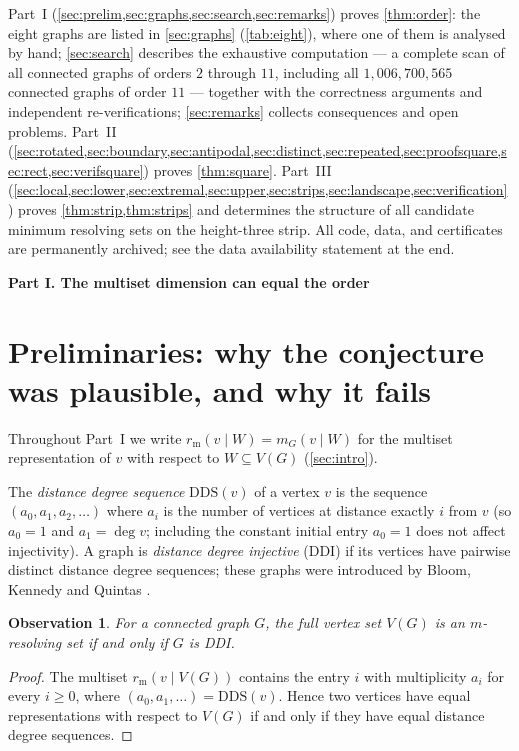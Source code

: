 \documentclass[11pt]{amsart}
\newtheorem{observation}[observation]{Observation}
\theoremstyle{remark}
\newcommand{\partheading}[1]{\bigskip\begin{center}{\Large\bfseries #1}\end{center}\medskip}
\begin{document}
Part~I (\cref{sec:prelim,sec:graphs,sec:search,sec:remarks}) proves \cref{thm:order}: the eight graphs are listed in \cref{sec:graphs} (\cref{tab:eight}), where one of them is analysed by hand; \cref{sec:search} describes the exhaustive computation --- a complete scan of all connected graphs of orders $2$ through $11$, including all $1{,}006{,}700{,}565$ connected graphs of order $11$ --- together with the correctness arguments and independent re-verifications; \cref{sec:remarks} collects consequences and open problems.  Part~II (\cref{sec:rotated,sec:boundary,sec:antipodal,sec:distinct,sec:repeated,sec:proofsquare,sec:rect,sec:verifsquare}) proves \cref{thm:square}.  Part~III (\cref{sec:local,sec:lower,sec:extremal,sec:upper,sec:strips,sec:landscape,sec:verification}) proves \cref{thm:strip,thm:strips} and determines the structure of all candidate minimum resolving sets on the height-three strip.  All code, data, and certificates are permanently archived; see the data availability statement at the end.

\partheading{Part I. The multiset dimension can equal the order}

\section{Preliminaries: why the conjecture was plausible, and why it fails}\label{sec:prelim}

Throughout Part~I we write $r_{\mathrm m}(v\mid W)=m_G(v\mid W)$ for the multiset representation of $v$ with respect to $W\subseteq V(G)$ (\cref{sec:intro}).

The \emph{distance degree sequence} $\mathrm{DDS}(v)$ of a vertex $v$ is the sequence $(a_0,a_1,a_2,\dots)$ where $a_i$ is the number of vertices at distance exactly $i$ from $v$ (so $a_0=1$ and $a_1=\deg v$; including the constant initial entry $a_0=1$ does not affect injectivity).  A graph is \emph{distance degree injective} (DDI) if its vertices have pairwise distinct distance degree sequences; these graphs were introduced by Bloom, Kennedy and Quintas \cite{BloomKennedyQuintas1983}.

\begin{observation}\label{obs:ddi}
For a connected graph $G$, the full vertex set $V(G)$ is an $m$-resolving set if and only if $G$ is DDI.
\end{observation}

\begin{proof}
The multiset $r_{\mathrm m}(v\mid V(G))$ contains the entry $i$ with multiplicity $a_i$ for every $i\ge 0$, where $(a_0,a_1,\dots)=\mathrm{DDS}(v)$.  Hence two vertices have equal representations with respect to $V(G)$ if and only if they have equal distance degree sequences.
\end{proof}
\end{document}
